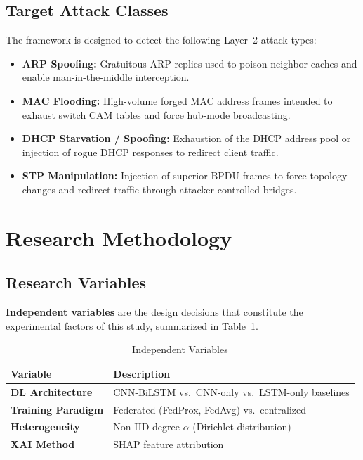 \documentclass[conference]{IEEEtran}
\begin{document}
\subsection{Target Attack Classes}

The framework is designed to detect the following Layer~2 attack types:
\begin{itemize}
  \item \textbf{ARP Spoofing:} Gratuitous ARP replies used to poison neighbor caches
        and enable man-in-the-middle interception.
  \item \textbf{MAC Flooding:} High-volume forged MAC address frames intended to
        exhaust switch CAM tables and force hub-mode broadcasting.
  \item \textbf{DHCP Starvation / Spoofing:} Exhaustion of the DHCP address pool or
        injection of rogue DHCP responses to redirect client traffic.
  \item \textbf{STP Manipulation:} Injection of superior BPDU frames to force
        topology changes and redirect traffic through attacker-controlled bridges.
\end{itemize}

\section{Research Methodology}
\label{sec:methodology}

\subsection{Research Variables}

\textbf{Independent variables} are the design decisions that constitute the
experimental factors of this study, summarized in Table~\ref{tab:indvars}.

\begin{table}[htbp]
\caption{Independent Variables}
\label{tab:indvars}
\renewcommand{\arraystretch}{1.2}
\begin{tabular}{>{\bfseries}p{2.2cm} p{5.3cm}}
\toprule
Variable & Description \\
\midrule
DL Architecture    & CNN-BiLSTM vs.\ CNN-only vs.\ LSTM-only baselines \\
Training Paradigm  & Federated (FedProx, FedAvg) vs.\ centralized \\
Heterogeneity      & Non-IID degree $\alpha$ (Dirichlet distribution) \\
XAI Method         & SHAP feature attribution \\
\bottomrule
\end{tabular}
\end{table}
\end{document}
